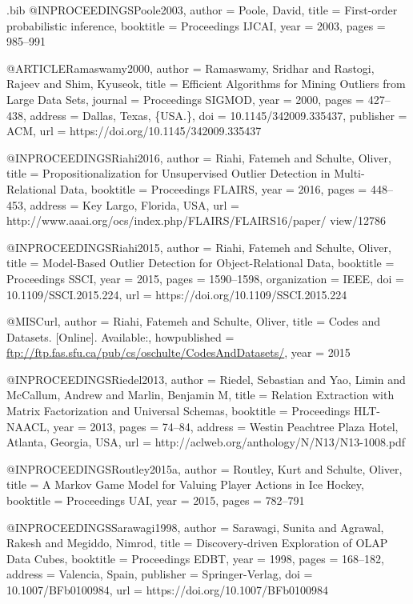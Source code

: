 {\begin{filecontents}{\jobname.bib}
@INPROCEEDINGS{Poole2003,
  author = {Poole, David},
  title = {{First-order probabilistic inference}},
  booktitle = {Proceedings IJCAI},
  year = {2003},
  pages = {985--991}
}

@ARTICLE{Ramaswamy2000,
  author = {Ramaswamy, Sridhar and Rastogi, Rajeev and Shim, Kyuseok},
  title = {Efficient Algorithms for Mining Outliers from Large Data Sets},
  journal = {Proceedings SIGMOD},
  year = {2000},
  pages = {427--438},
  address = {Dallas, Texas, {\{}USA.{\}}},
  doi = {10.1145/342009.335437},
  publisher = {ACM},
  url = {https://doi.org/10.1145/342009.335437}
}

@INPROCEEDINGS{Riahi2016,
  author = {Riahi, Fatemeh and Schulte, Oliver},
  title = {Propositionalization for Unsupervised Outlier Detection in Multi-Relational
	Data},
  booktitle = {Proceedings {FLAIRS}},
  year = {2016},
  pages = {448--453},
  address = {Key Largo, Florida, USA},
  url = {http://www.aaai.org/ocs/index.php/FLAIRS/FLAIRS16/paper/ view/12786}
}

@INPROCEEDINGS{Riahi2015,
  author = {Riahi, Fatemeh and Schulte, Oliver},
  title = {{Model-Based Outlier Detection for Object-Relational Data}},
  booktitle = {Proceedings SSCI},
  year = {2015},
  pages = {1590--1598},
  organization = {IEEE},
  doi = {10.1109/SSCI.2015.224},
  url = {https://doi.org/10.1109/SSCI.2015.224}
}

@MISC{url,
  author = {Riahi, Fatemeh and Schulte, Oliver},
  title = {Codes and Datasets. [Online]. Available:},
  howpublished = {\url{ftp://ftp.fas.sfu.ca/pub/cs/oschulte/CodesAndDatasets/}},
  year = {2015}
}

@INPROCEEDINGS{Riedel2013,
  author = {Riedel, Sebastian and Yao, Limin and McCallum, Andrew and Marlin, Benjamin M},
  title = {Relation Extraction with Matrix Factorization and Universal Schemas},
  booktitle = {Proceedings HLT-NAACL},
  year = {2013},
  pages = {74--84},
  address = {Westin Peachtree Plaza Hotel, Atlanta, Georgia, USA},
  url = {http://aclweb.org/anthology/N/N13/N13-1008.pdf}
}

@INPROCEEDINGS{Routley2015a,
  author = {Routley, Kurt and Schulte, Oliver},
  title = {A {Markov} Game Model for Valuing Player Actions in Ice Hockey},
  booktitle = {Proceedings UAI},
  year = {2015},
  pages = {782--791}
}

@INPROCEEDINGS{Sarawagi1998,
  author = {Sarawagi, Sunita and Agrawal, Rakesh and Megiddo, Nimrod},
  title = {Discovery-driven Exploration of {OLAP} Data Cubes},
  booktitle = {Proceedings EDBT},
  year = {1998},
  pages = {168--182},
  address = {Valencia, Spain},
  publisher = {Springer-Verlag},
  doi = {10.1007/BFb0100984},
  url = {https://doi.org/10.1007/BFb0100984}
}


\end{filecontents}}
